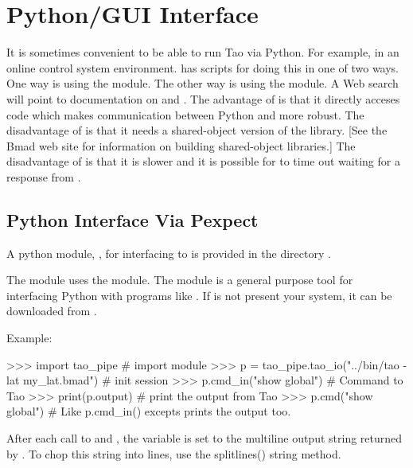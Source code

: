 \chapter{Python/GUI Interface}
\label{c:python}

It is sometimes convenient to be able to run Tao via Python. For example, in an online control
system environment. \tao has scripts for doing this in one of two ways. One way is using the
 module. The other way is using the  module. A Web search will point to
documentation on  and . The advantage of  is that it directly
acceses \tao code which makes communication between Python and \tao more robust. The disadvantage of
 is that it needs a shared-object version of the  library. [See the Bmad web site
for information on building shared-object libraries.] The disadvantage of  is that it is
slower and it is possible for  to time out waiting for a response from \tao.

\section{Python Interface Via Pexpect}

A python module, , for interfacing \tao to 
is provided in the directory .

The  module uses the  module. The
 module is a general purpose tool for interfacing
Python with programs like \tao. If  is not present
your system, it can be downloaded from
. 

Example:
\begin{example}
  >>> import tao_pipe                                       # import module
  >>> p = tao_pipe.tao_io("../bin/tao -lat my_lat.bmad")    # init session
  >>> p.cmd_in("show global")               # Command to Tao
  >>> print(p.output)                       # print the output from Tao
  >>> p.cmd("show global")                  # Like p.cmd_in() excepts prints the output too.
\end{example}

After each call to  and , the
 variable is set to the multiline output string
returned by \tao. To chop this string into lines, use the splitlines()
string method.

